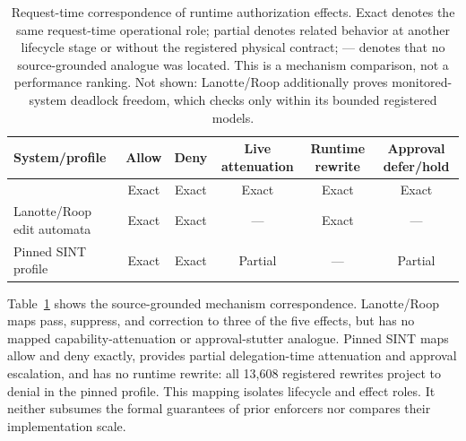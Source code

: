 \begin{table}[t]
\caption{Request-time correspondence of runtime authorization effects. Exact denotes the same request-time operational role; partial denotes related behavior at another lifecycle stage or without the registered physical contract; --- denotes that no source-grounded analogue was located. This is a mechanism comparison, not a performance ranking. Not shown: Lanotte/Roop additionally proves monitored-system deadlock freedom, which \zonecap{} checks only within its bounded registered models.}
\label{tab:effect-mapping}
\centering
\footnotesize
\setlength{\tabcolsep}{7pt}
\begin{tabular}{@{}lccccc@{}}
\toprule
System/profile & Allow & Deny & Live attenuation & Runtime rewrite & Approval defer/hold \\
\midrule
\zonecap{} & Exact & Exact & Exact & Exact & Exact \\
Lanotte/Roop edit automata & Exact & Exact & --- & Exact & --- \\
Pinned SINT profile & Exact & Exact & Partial & --- & Partial \\
\bottomrule
\end{tabular}
\end{table}

Table~\ref{tab:effect-mapping} shows the source-grounded mechanism correspondence. Lanotte/Roop maps pass, suppress, and correction to three of the five effects, but has no mapped capability-attenuation or approval-stutter analogue. Pinned SINT maps allow and deny exactly, provides partial delegation-time attenuation and approval escalation, and has no runtime rewrite: all 13,608 registered \zonecap{} rewrites project to denial in the pinned profile. This mapping isolates lifecycle and effect roles. It neither subsumes the formal guarantees of prior enforcers nor compares their implementation scale.

\ifzonecaphardware

\fi
